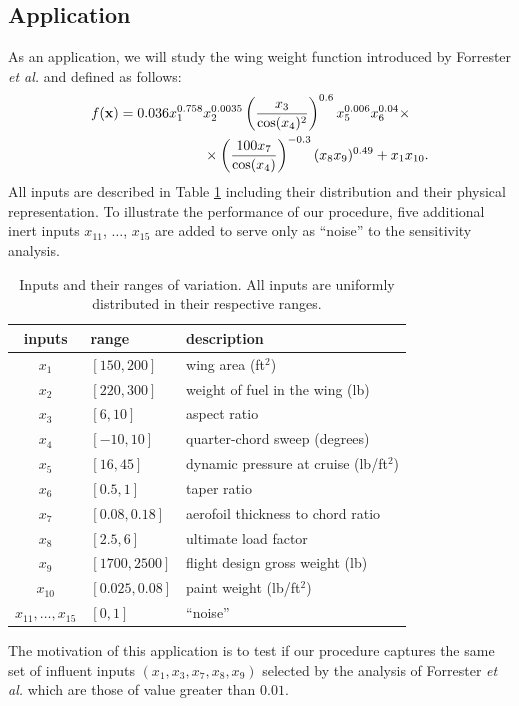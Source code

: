 {\color{purple}
\subsection{Application}
\label{sec:5.2}

As an application, we will study the wing weight function introduced by Forrester \textit{et al.} \cite{Forrester} and defined as follows:
\begin{align*}
f(\boldsymbol{\mathbf{x}})=0.036 x_1^{0.758} & x_2^{0.0035} \left(\frac{x_3}{\cos(x_4)^2}\right)^{0.6} x_5^{0.006} x_6^{0.04}\times \\
 & \times\left(\frac{100 x_7}{\cos(x_4)}\right)^{-0.3} (x_8 x_9)^{0.49} + x_1 x_{10}.
\end{align*}
All inputs are described in Table \ref{wing_inputs_table} including their distribution and their physical representation. To illustrate the performance of our procedure, five additional inert inputs $x_{11}$, $\dots$, $x_{15}$ are added to serve only as ``noise'' to the sensitivity analysis.
\begin{table}[t]
\caption{Inputs and their ranges of variation. All inputs are uniformly distributed in their respective ranges.}
\centering
\begin{tabular}{cll}
\hline
 inputs & range & description \\ \hline
$x_1$ & $[150, 200]$ & wing area (ft$^2$) \\
$x_2$ & $[220, 300]$ & weight of fuel in the wing (lb) \\
$x_3$ & $[6, 10]$ & aspect ratio \\
$x_4$ & $[-10, 10]$ & quarter-chord sweep (degrees) \\
$x_5$ & $[16, 45]$ & dynamic pressure at cruise (lb/ft$^2$) \\
$x_6$ & $[0.5, 1]$ & taper ratio \\
$x_7$ & $[0.08, 0.18]$ & aerofoil thickness to chord ratio \\
$x_8$ & $[2.5, 6]$ & ultimate load factor \\
$x_9$ & $[1700, 2500]$ & flight design gross weight (lb) \\
$x_{10}$ & $[0.025, 0.08]$ & paint weight (lb/ft$^2$) \\
$x_{11},\dots,x_{15}$ & $[0,1]$ & ``noise'' \\
\hline
\end{tabular}
\label{wing_inputs_table}
\end{table}

The motivation of this application is to test if our procedure captures the same set of influent inputs $(x_1,x_3,x_7,x_8,x_9)$ selected by the analysis of Forrester \textit{et al.} which are those of value greater than $0.01$.

}
